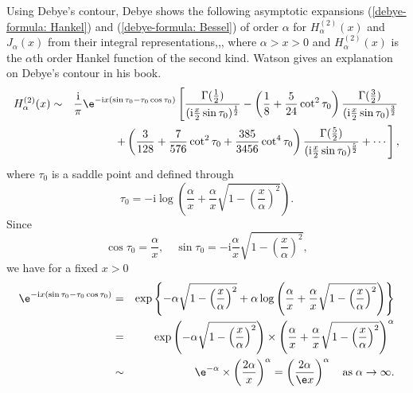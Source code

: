 \documentclass[12pt]{report}
\begin{document}

%


\label{Debye formula}
Using Debye's contour, Debye shows the following asymptotic expansions (\ref{debye-formula: Hankel}) and (\ref{debye-formula: Bessel}) of order $\alpha$ for $H^{(2)}_{\alpha}(x)$ and $J_\alpha(x)$ from their integral representations\cite{Debye},\cite{Olver1997},\cite{Watson1966}, where $\alpha>x>0$ and $H^{(2)}_{\alpha}(x)$ is the $\alpha$th order Hankel function of the second kind. Watson gives an explanation on Debye's contour in his book\cite{Watson1966}.
\begin{eqnarray}
H^{(2)}_{\alpha}(x)&\sim&\frac{\mathrm{i}}{\pi}\e^{-\mathrm{i}x(\sin\tau_0-\tau_0\cos\tau_0)}\left[\frac{\Gamma(\frac{1}{2})}{(\mathrm{i}\frac{x}{2}\sin\tau_0)^{\frac{1}{2}}}-\left(\frac{1}{8}+\frac{5}{24}\cot^2\tau_0\right)\frac{\Gamma(\frac{3}{2})}{(\mathrm{i}\frac{x}{2}\sin\tau_0)^{\frac{3}{2}}}\right. \nonumber\\
&&\left.+\left(\frac{3}{128}+\frac{7}{576}\cot^2\tau_0+\frac{385}{3456}\cot^4\tau_0\right)\frac{\Gamma(\frac{5}{2})}{(\mathrm{i}\frac{x}{2}\sin\tau_0)^{\frac{5}{2}}}+\cdots\right],
\label{debye-formula: Hankel}
\end{eqnarray}
where $\tau_0$ is a saddle point and defined through
\begin{equation}
\tau_0=-\mathrm{i}\log\left(\frac{\alpha}{x}+\frac{\alpha}{x}\sqrt{1-\left(\frac{x}{\alpha}\right)^2}\right).
\label{tau_0}
\end{equation}
Since 
\begin{displaymath}
\cos\tau_0=\frac{\alpha}{x}, \quad \sin\tau_0=-\mathrm{i}\frac{\alpha}{x}\sqrt{1-\left(\frac{x}{\alpha}\right)^2},
\end{displaymath}
we have for a fixed $x>0$
\begin{eqnarray*}
\e^{-\mathrm{i}x(\sin\tau_0-\tau_0\cos\tau_0)}&=&\exp\left\{-\alpha\sqrt{1-\left(\frac{x}{\alpha}\right)^2}+\alpha\log\left(\frac{\alpha}{x}+\frac{\alpha}{x}\sqrt{1-\left(\frac{x}{\alpha}\right)^2}\right)\right\} \\
&=&\exp\left(-\alpha\sqrt{1-\left(\frac{x}{\alpha}\right)^2}\right) \times \left(\frac{\alpha}{x}+\frac{\alpha}{x}\sqrt{1-\left(\frac{x}{\alpha}\right)^2}\right)^\alpha \\
&\sim& \e^{-\alpha} \times \left(\frac{2\alpha}{x}\right)^\alpha=\left(\frac{2\alpha}{\e x}\right)^\alpha \quad {\rm as}\;\alpha\rightarrow\infty.
\end{eqnarray*}
\end{document}
